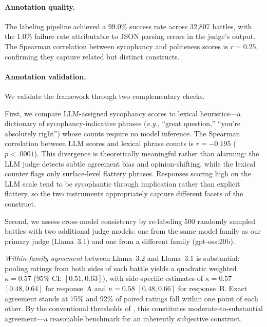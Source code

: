 \documentclass[11pt,twocolumn,a4paper]{article}
\newcommand{\eg}{\textit{e.g.}}
\begin{document}
\paragraph{Annotation quality.} The labeling pipeline achieved a
99.0\% success rate across 32,807 battles, with the 1.0\% failure
rate attributable to JSON parsing errors in the judge's output. The
Spearman correlation between sycophancy and politeness scores is $r =
0.25$, confirming they capture related but distinct constructs.

\paragraph{Annotation validation.} We validate the framework through
two complementary checks.

First, we compare LLM-assigned sycophancy scores to lexical
heuristics---a dictionary of sycophancy-indicative phrases (\eg,
``great question,'' ``you're absolutely right'') whose counts require
no model inference. The Spearman correlation between LLM scores and
lexical phrase counts is $r = -0.195$ ($p < .0001$). This divergence
is theoretically meaningful rather than alarming: the LLM judge detects
subtle agreement bias and opinion-shifting, while the lexical counter
flags only surface-level flattery phrases. Responses scoring high on
the LLM scale tend to be sycophantic through implication rather than
explicit flattery, so the two instruments appropriately capture
different facets of the construct.

Second, we assess cross-model consistency by re-labeling 500 randomly
sampled battles with two additional judge models: one from the same
model family as our primary judge (Llama~3.1) and one from a different
family (gpt-oss:20b).

\textit{Within-family agreement} between Llama~3.2 and Llama~3.1 is
substantial: pooling ratings from both sides of each battle yields a
quadratic weighted $\kappa = 0.57$ (95\% CI: $[0.51, 0.63]$),
with side-specific estimates of $\kappa = 0.57$ $[0.48, 0.64]$ for
response~A and $\kappa = 0.58$ $[0.48, 0.66]$ for response~B.
Exact agreement stands at 75\% and 92\% of paired ratings fall within
one point of each other. By the conventional thresholds of
\citet{landis1977measurement}, this constitutes moderate-to-substantial
agreement---a reasonable benchmark for an inherently subjective
construct.
\end{document}
